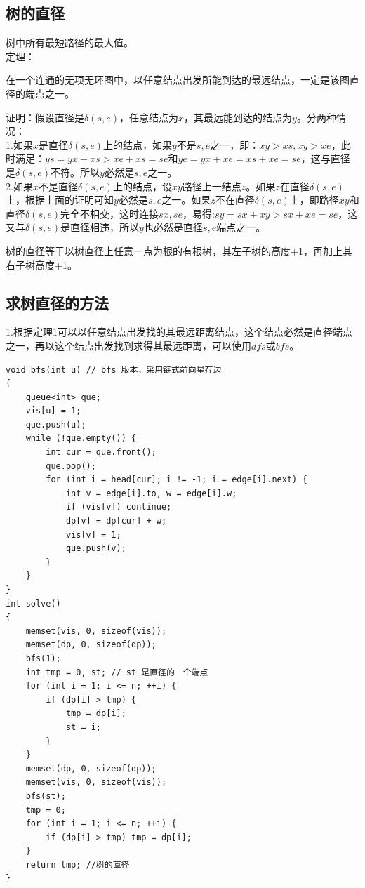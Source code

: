 \subsection{树的直径}
树中所有最短路径的最大值。 \\
定理：
\begin{center}
在一个连通的无项无环图中，以任意结点出发所能到达的最远结点，一定是该图直径的端点之一。
\end{center}
证明：假设直径是$\delta (s,e)$，任意结点为$x$，其最远能到达的结点为$y$。分两种情况： \\
1.如果$x$是直径$\delta (s,e)$上的结点，如果$y$不是$s,e$之一，即：$xy>xs,xy>xe$，此时满足：$ys=yx+xs>xe+xs=se$和$ye=yx+xe=xs+xe=se$，这与直径是$\delta (s,e)$不符。所以$y$必然是$s,e$之一。\\
2.如果$x$不是直径$\delta (s,e)$上的结点，设$xy$路径上一结点$z$。如果$z$在直径$\delta (s,e)$上，根据上面的证明可知$y$必然是$s,e$之一。如果$z$不在直径$\delta (s,e)$上，即路径$xy$和直径$\delta (s,e)$完全不相交，这时连接$sx,se$，易得:$sy=sx+xy>sx+xe=se$，这又与$\delta (s,e)$是直径相违，所以$y$也必然是直径$s,e$端点之一。
\begin{center}
树的直径等于以树直径上任意一点为根的有根树，其左子树的高度+1，再加上其右子树高度+1。
\end{center}

\subsection{求树直径的方法}

1.根据定理1可以以任意结点出发找的其最远距离结点，这个结点必然是直径端点之一，再以这个结点出发找到求得其最远距离，可以使用$dfs$或$bfs$。
\begin{lstlisting}
void bfs(int u) // bfs 版本，采用链式前向星存边
{
	queue<int> que;
	vis[u] = 1;
	que.push(u);
	while (!que.empty()) {
		int cur = que.front();
		que.pop();
		for (int i = head[cur]; i != -1; i = edge[i].next) {
			int v = edge[i].to, w = edge[i].w;
			if (vis[v]) continue;
			dp[v] = dp[cur] + w;
			vis[v] = 1;
			que.push(v);
		}
	}
}
int solve()
{
	memset(vis, 0, sizeof(vis));
	memset(dp, 0, sizeof(dp));
	bfs(1);
	int tmp = 0, st; // st 是直径的一个端点
	for (int i = 1; i <= n; ++i) {
		if (dp[i] > tmp) {
			tmp = dp[i];
			st = i;
		}
	}
	memset(dp, 0, sizeof(dp));
	memset(vis, 0, sizeof(vis));
	bfs(st);
	tmp = 0;
	for (int i = 1; i <= n; ++i) {
		if (dp[i] > tmp) tmp = dp[i];
	}
	return tmp; //树的直径
}
\end{lstlisting}

